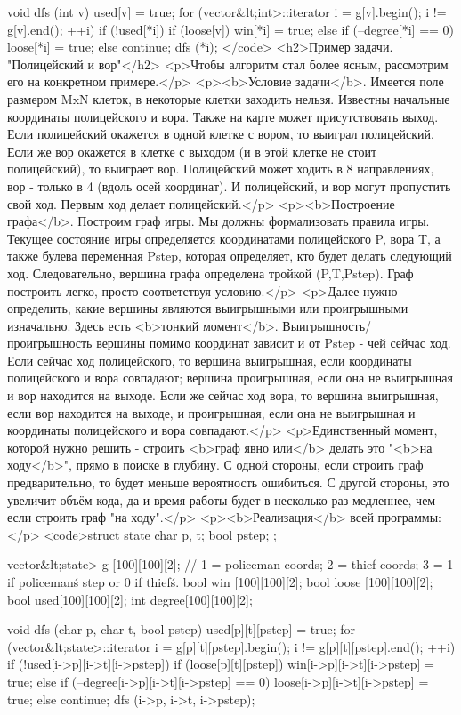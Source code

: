 void dfs (int v) {
	used[v] = true;
	for (vector&lt;int>::iterator i = g[v].begin(); i != g[v].end(); ++i)
		if (!used[*i]) {
			if (loose[v])
				win[*i] = true;
			else if (--degree[*i] == 0)
				loose[*i] = true;
			else
				continue;
			dfs (*i);
		}
}</code>
<h2>Пример задачи. "Полицейский и вор"</h2>
<p>Чтобы алгоритм стал более ясным, рассмотрим его на конкретном примере.</p>
<p><b>Условие задачи</b>. Имеется поле размером MxN клеток, в некоторые клетки заходить нельзя. Известны начальные координаты полицейского и вора. Также на карте может присутствовать выход. Если полицейский окажется в одной клетке с вором, то выиграл полицейский. Если же вор окажется в клетке с выходом (и в этой клетке не стоит полицейский), то выиграет вор. Полицейский может ходить в 8 направлениях, вор - только в 4 (вдоль осей координат). И полицейский, и вор могут пропустить свой ход. Первым ход делает полицейский.</p>
<p><b>Построение графа</b>. Построим граф игры. Мы должны формализовать правила игры. Текущее состояние игры определяется координатами полицейского P, вора T, а также булева переменная Pstep, которая определяет, кто будет делать следующий ход. Следовательно, вершина графа определена тройкой (P,T,Pstep). Граф построить легко, просто соответствуя условию.</p>
<p>Далее нужно определить, какие вершины являются выигрышными или проигрышными изначально. Здесь есть <b>тонкий момент</b>. Выигрышность/проигрышность вершины помимо координат зависит и от Pstep - чей сейчас ход. Если сейчас ход полицейского, то вершина выигрышная, если координаты полицейского и вора совпадают; вершина проигрышная, если она не выигрышная и вор находится на выходе. Если же сейчас ход вора, то вершина выигрышная, если вор находится на выходе, и проигрышная, если она не выигрышная и координаты полицейского и вора совпадают.</p>
<p>Единственный момент, которой нужно решить - строить <b>граф явно или</b> делать это "<b>на ходу</b>", прямо в поиске в глубину. С одной стороны, если строить граф предварительно, то будет меньше вероятность ошибиться. С другой стороны, это увеличит объём кода, да и время работы будет в несколько раз медленнее, чем если строить граф "на ходу".</p>
<p><b>Реализация</b> всей программы:</p>
<code>struct state {
	char p, t;
	bool pstep;
};

vector&lt;state> g [100][100][2];
// 1 = policeman coords; 2 = thief coords; 3 = 1 if policeman\'s step or 0 if thief\'s.
bool win [100][100][2];
bool loose [100][100][2];
bool used[100][100][2];
int degree[100][100][2];

void dfs (char p, char t, bool pstep) {
	used[p][t][pstep] = true;
	for (vector&lt;state>::iterator i = g[p][t][pstep].begin(); i != g[p][t][pstep].end(); ++i)
		if (!used[i->p][i->t][i->pstep]) {
			if (loose[p][t][pstep])
				win[i->p][i->t][i->pstep] = true;
			else if (--degree[i->p][i->t][i->pstep] == 0)
				loose[i->p][i->t][i->pstep] = true;
			else
				continue;
			dfs (i->p, i->t, i->pstep);
		}
}


